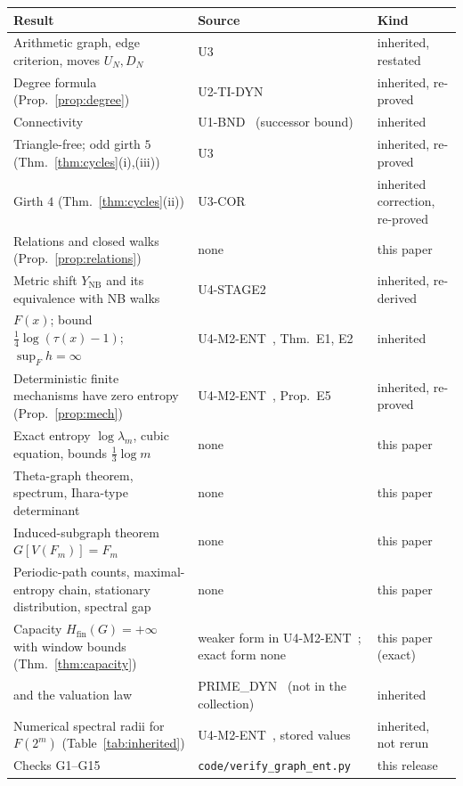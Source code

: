 \begin{center}\scriptsize
\begin{tabular}{@{}p{}p{}p{}@{}}\toprule
Result & Source & Kind\\\midrule
Arithmetic graph, edge criterion, moves $U_N,D_N$ & U3~\cite{UTHREE} & inherited, restated\\
Degree formula (Prop.~\ref{prop:degree}) & U2-TI-DYN~\cite{UTI} & inherited, re-proved\\
Connectivity & U1-BND~\cite{UBND} (successor bound) & inherited\\
Triangle-free; odd girth $5$ (Thm.~\ref{thm:cycles}(i),(iii)) & U3~\cite{UTHREE} & inherited, re-proved\\
Girth $4$ (Thm.~\ref{thm:cycles}(ii)) & U3-COR~\cite{UCOR} & inherited correction, re-proved\\
Relations and closed walks (Prop.~\ref{prop:relations}) & none & this paper\\
Metric shift $Y_{\mathrm{NB}}$ and its equivalence with NB walks & U4-STAGE2~\cite{USTAGE} & inherited, re-derived\\
$F(x)$; bound $\tfrac14\log(\tau(x)-1)$; $\sup_F h=\infty$ & U4-M2-ENT~\cite{UENT}, Thm.~E1, E2 & inherited\\
Deterministic finite mechanisms have zero entropy (Prop.~\ref{prop:mech}) & U4-M2-ENT~\cite{UENT}, Prop.~E5 & inherited, re-proved\\
Exact entropy $\log\lambda_m$, cubic equation, bounds $\tfrac13\log m$ & none & this paper\\
Theta-graph theorem, spectrum, Ihara-type determinant & none & this paper\\
Induced-subgraph theorem $G[V(F_m)]=F_m$ & none & this paper\\
Periodic-path counts, maximal-entropy chain, stationary distribution, spectral gap & none & this paper\\
Capacity $H_{\mathrm{fin}}(G)=+\infty$ with window bounds (Thm.~\ref{thm:capacity}) & weaker form in U4-M2-ENT~\cite{UENT}; exact form none & this paper (exact)\\
\MAXPP{} and the valuation law & PRIME\_DYN~\cite{PD} (not in the collection) & inherited\\
Numerical spectral radii for $F(2^m)$ (Table~\ref{tab:inherited}) & U4-M2-ENT~\cite{UENT}, stored values & inherited, not rerun\\
Checks G1--G15 & \texttt{code/verify\_graph\_ent.py} & this release\\
\bottomrule\end{tabular}\end{center}

